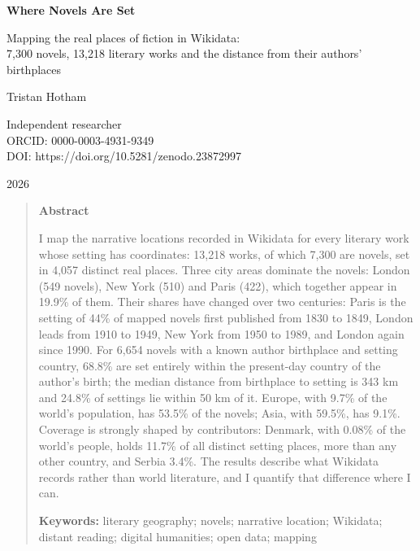 \documentclass[11pt,a4paper]{article}
\begin{document}
\begin{center}
{\Large\bfseries Where Novels Are Set\par}
\vspace{0.4em}
{\large Mapping the real places of fiction in Wikidata:\\7,300 novels, 13,218 literary works and the distance from their authors' birthplaces\par}
\vspace{1.2em}
{\large Tristan Hotham\par}
\vspace{0.3em}
{\small Independent researcher\\
ORCID: 0000-0003-4931-9349\\
DOI: https://doi.org/10.5281/zenodo.23872997\par}
\vspace{0.8em}
2026
\end{center}

\begin{quote}
\small
\begin{center}\textbf{Abstract}\end{center}
I map the narrative locations recorded in Wikidata for every literary work whose setting has coordinates: 13,218 works, of which 7,300 are novels, set in 4,057 distinct real places. Three city areas dominate the novels: London (549 novels), New York (510) and Paris (422), which together appear in 19.9\% of them. Their shares have changed over two centuries: Paris is the setting of 44\% of mapped novels first published from 1830 to 1849, London leads from 1910 to 1949, New York from 1950 to 1989, and London again since 1990. For 6,654 novels with a known author birthplace and setting country, 68.8\% are set entirely within the present-day country of the author's birth; the median distance from birthplace to setting is 343 km and 24.8\% of settings lie within 50 km of it. Europe, with 9.7\% of the world's population, has 53.5\% of the novels; Asia, with 59.5\%, has 9.1\%. Coverage is strongly shaped by contributors: Denmark, with 0.08\% of the world's people, holds 11.7\% of all distinct setting places, more than any other country, and Serbia 3.4\%. The results describe what Wikidata records rather than world literature, and I quantify that difference where I can.

\textbf{Keywords:} literary geography; novels; narrative location; Wikidata; distant reading; digital humanities; open data; mapping
\end{quote}
\end{document}
